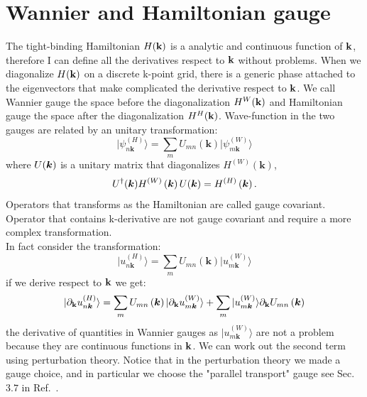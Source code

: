 \documentclass[preprint,showpacs,prb,superscriptaddress,aps,floatfix]{revtex4-1}
\newcommand{\kk}{{\bf k}}
\renewcommand{\[}{\left[}
\renewcommand{\]}{\right]}
\renewcommand{\(}{\left(}
\renewcommand{\)}{\right)}
\def\ket#1{\vert#1\rangle}
\begin{document}
\section{Wannier and Hamiltonian gauge}
The tight-binding Hamiltonian $H(\kk)$ is a analytic and continuous function of $\kk$, therefore I can define all the derivatives respect to $\kk$ without problems. When we diagonalize $H(\kk)$ on a discrete k-point grid, there is a generic phase attached to the eigenvectors that make complicated the derivative respect to $\kk$. We call Wannier gauge the space before the diagonalization  $H^{W}(\kk)$ and Hamiltonian gauge the space after the diagonalization $H^{H}(\kk)$. Wave-function in the two gauges are related by an unitary transformation:
\begin{equation}
\ket{\psi_{n\boldsymbol{k}}^{\left(H\right)}}=\sum_{m}U_{mn}\left(\boldsymbol{k}\right)\ket{\psi_{m\boldsymbol{k}}^{\left(W\right)}}
\end{equation}
where $U\text{\ensuremath{\left(\boldsymbol{k}\right)}}$ is a unitary
matrix that diagonalizes $H^{(W)}\left(\boldsymbol{k}\right)$,
\begin{equation}
U^{\dagger}\text{\ensuremath{\left(\boldsymbol{k}\right)}}H^{(W)}\left(\boldsymbol{k}\right)U\text{\ensuremath{\left(\boldsymbol{k}\right)}}=H^{(H)}\left(\boldsymbol{k}\right).
\end{equation}
Operators that transforms as the Hamiltonian are called gauge covariant. Operator that contains k-derivative are not gauge covariant and require a more complex transformation.\\
In fact consider the transformation:
\begin{equation}
\ket{u_{n\boldsymbol{k}}^{\left(H\right)}}=\sum_{m}U_{mn}\left(\boldsymbol{k}\right)\ket{u_{m\boldsymbol{k}}^{\left(W\right)}}
	\label{u_transf}
\end{equation}
if we derive respect to $\kk$ we get:
\begin{equation}
	\ket{ \partial_{\kk} u_{n\boldsymbol{k}}^{\left(H\right)}}=\sum_{m}U_{mn}\left(\boldsymbol{k}\right)\ket{\partial_{\kk} u_{m\boldsymbol{k}}^{\left(W\right)}} + \sum_{m}\ket{u_{m\boldsymbol{k}}^{\left(W\right)}} \partial_\kk U_{mn}\left(\boldsymbol{k}\right)
	\label{deriv_u}
\end{equation}
the derivative of quantities in Wannier gauges as $\ket{u_{m\boldsymbol{k}}^{\left(W\right)}}$ are not a problem because they are continuous functions in $\kk$. We can work out the second term using perturbation theory.\cite{wang2006ab} 
Notice that in the perturbation theory we made a gauge choice, and in particular we choose the "parallel transport" gauge see Sec.~$3.7$ in Ref.~. \\
\end{document}
